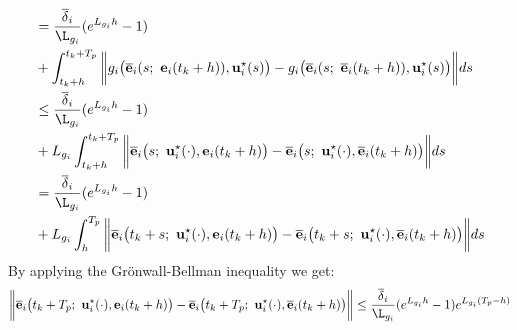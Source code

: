 \begin{gg_box}
\begin{align}
  &= \dfrac{\overline{\delta}_i}{\L_{g_i}} (e^{L_{g_i} h} - 1) \\
  &+ \int_{t_k +h}^{t_k + T_p} \bigg\| g_i\big(\overline{\vect{e}}_i(s;\ \vect{e}_i(t_k + h)), \vect{u}_i^{\star}(s)\big)
    - g_i\big(\overline{\vect{e}}_i(s;\ \overline{\vect{e}}_i(t_k + h)), \vect{u}_i^{\star}(s)\big) \bigg\| ds \\
  &\leq \dfrac{\overline{\delta}_i}{\L_{g_i}} (e^{L_{g_i} h} - 1) \\
  &+ L_{g_i}\int_{t_k +h}^{t_k + T_p} \bigg\| \overline{\vect{e}}_i\big(s;\ \vect{u}_i^{\star}(\cdot), \vect{e}_i(t_k + h) \big)
    - \overline{\vect{e}}_i\big(s;\ \vect{u}_i^{\star}(\cdot), \overline{\vect{e}}_i(t_k + h)\big)  \bigg\| ds \\
  &= \dfrac{\overline{\delta}_i}{\L_{g_i}} (e^{L_{g_i} h} - 1) \\
  &+ L_{g_i}\int_{h}^{T_p} \bigg\| \overline{\vect{e}}_i\big(t_k + s;\ \vect{u}_i^{\star}(\cdot), \vect{e}_i(t_k + h) \big)
    - \overline{\vect{e}}_i\big(t_k + s;\ \vect{u}_i^{\star}(\cdot), \overline{\vect{e}}_i(t_k + h)\big)  \bigg\| ds \\
\end{align}
By applying the Gr\"{o}nwall-Bellman inequality we get:
\begin{align}
  &\bigg\| \overline{\vect{e}}_i\big(t_k + T_p;\ \vect{u}_i^{\star}(\cdot), \vect{e}_i(t_k +h)\big) -
    \overline{\vect{e}}_i\big(t_k + T_p;\ \vect{u}_i^{\star}(\cdot), \overline{\vect{e}}_i(t_k +h)\big) \bigg\|
  \leq \dfrac{\overline{\delta}_i}{\L_{g_i}} (e^{L_{g_i} h} - 1) e^{L_{g_i}(T_p - h)}\\
\end{align}

\end{gg_box}


























